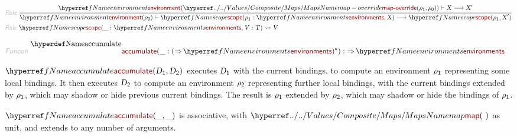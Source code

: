 \begin{displaymath}
\relax\begin{aligned}\relax
  \KEY{Rule} ~ 
    & \RULE{
      \NAMEREF{environment} (\NAMEHYPER{../../Values/Composite}{Maps}{map-override}
                              (\VAR{$\rho$}\SUB{1},   
                               \VAR{$\rho$}\SUB{0})) \vdash \VAR{X} \TRANS \VAR{X}'
      }{
      \NAMEREF{environment} (\VAR{$\rho$}\SUB{0}) \vdash \NAMEREF{scope}
                    (\VAR{$\rho$}\SUB{1} : \NAMEREF{environments},   
                     \VAR{X}) \TRANS \NAMEREF{scope}
                                                               (\VAR{$\rho$}\SUB{1},   
                                                                \VAR{X}')
      }
\\
  \KEY{Rule} ~ 
    & \NAMEREF{scope}
        (\_ : \NAMEREF{environments},   
         \VAR{V} : \VAR{T}) \leadsto \VAR{V}
\end{aligned}
\end{displaymath}

\begin{displaymath}
\relax\begin{aligned}\relax
  \KEY{Funcon} ~ 
  & \NAMEDECL{accumulate}(\_ : ( \TO \NAMEREF{environments})\STAR) :  \TO \NAMEREF{environments}
\end{aligned}
\end{displaymath}

$\SHADE{\NAMEREF{accumulate}
           (\VAR{D}\SUB{1},   
            \VAR{D}\SUB{2})}$ executes $\SHADE{\VAR{D}\SUB{1}}$ with the current bindings, to compute an
  environment $\SHADE{\VAR{$\rho$}\SUB{1}}$ representing some local bindings. It then executes $\SHADE{\VAR{D}\SUB{2}}$ to
  compute an environment $\SHADE{\VAR{$\rho$}\SUB{2}}$ representing further local bindings, with the
  current bindings extended by $\SHADE{\VAR{$\rho$}\SUB{1}}$, which may shadow or hide previous
  current bindings. The result is $\SHADE{\VAR{$\rho$}\SUB{1}}$ extended by $\SHADE{\VAR{$\rho$}\SUB{2}}$, which may shadow
  or hide the bindings of $\SHADE{\VAR{$\rho$}\SUB{1}}$.

$\SHADE{\NAMEREF{accumulate}
           (\_,   
            \_)}$ is associative, with $\SHADE{\NAMEHYPER{../../Values/Composite}{Maps}{map}
           ( ~ )}$ as unit, and extends to any
  number of arguments.

